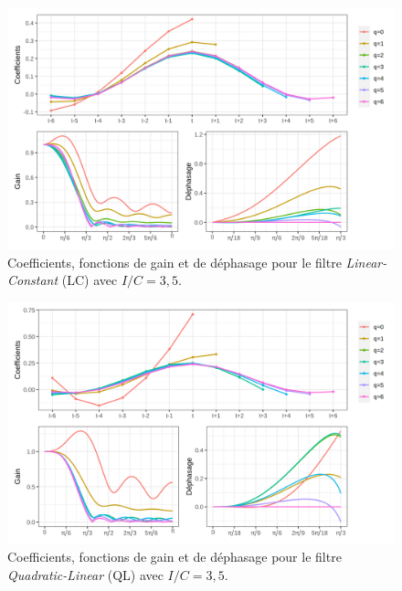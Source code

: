 \documentclass[
  11pt,
  french,
  a4paper]{article}
\newcommand\1{\mathds{1}}
\begin{document}
\begin{figure}[H]

{\centering \includegraphics[width=1\linewidth]{img/filters_used/lc} 

}

\caption[Coefficients, fonctions de gain et de déphasage pour le filtre \emph{Linear-Constant} (LC) avec \(I/C=3,5\)]{Coefficients, fonctions de gain et de déphasage pour le filtre \emph{Linear-Constant} (LC) avec \(I/C=3,5\).}\label{fig:graphslc}

\footnotesize
\normalsize\end{figure}

\begin{figure}[H]

{\centering \includegraphics[width=1\linewidth]{img/filters_used/ql} 

}

\caption[Coefficients, fonctions de gain et de déphasage pour le filtre \emph{Quadratic-Linear} (QL) avec \(I/C=3,5\)]{Coefficients, fonctions de gain et de déphasage pour le filtre \emph{Quadratic-Linear} (QL) avec \(I/C=3,5\).}\label{fig:graphsql}

\footnotesize
\normalsize\end{figure}
\end{document}
